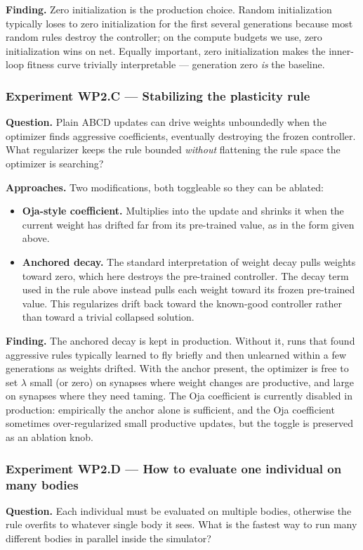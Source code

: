 \documentclass[letterpaper,10pt]{article}
\begin{document}
\textbf{Finding.} Zero initialization is the production choice. Random initialization typically loses to zero initialization for the first several generations because most random rules destroy the controller; on the compute budgets we use, zero initialization wins on net. Equally important, zero initialization makes the inner-loop fitness curve trivially interpretable --- generation zero \emph{is} the baseline.

\subsubsection{Experiment WP2.C --- Stabilizing the plasticity rule}
\textbf{Question.} Plain ABCD updates can drive weights unboundedly when the optimizer finds aggressive coefficients, eventually destroying the frozen controller. What regularizer keeps the rule bounded \emph{without} flattening the rule space the optimizer is searching?

\textbf{Approaches.} Two modifications, both toggleable so they can be ablated:
\begin{itemize}
    \item \textbf{Oja-style coefficient.} Multiplies into the update and shrinks it when the current weight has drifted far from its pre-trained value, as in the form given above.
    \item \textbf{Anchored decay.} The standard interpretation of weight decay pulls weights toward zero, which here destroys the pre-trained controller. The decay term used in the rule above instead pulls each weight toward its frozen pre-trained value. This regularizes drift back toward the known-good controller rather than toward a trivial collapsed solution.
\end{itemize}

\textbf{Finding.} The anchored decay is kept in production. Without it, runs that found aggressive rules typically learned to fly briefly and then unlearned within a few generations as weights drifted. With the anchor present, the optimizer is free to set $\lambda$ small (or zero) on synapses where weight changes are productive, and large on synapses where they need taming. The Oja coefficient is currently disabled in production: empirically the anchor alone is sufficient, and the Oja coefficient sometimes over-regularized small productive updates, but the toggle is preserved as an ablation knob.

\subsubsection{Experiment WP2.D --- How to evaluate one individual on many bodies}
\textbf{Question.} Each individual must be evaluated on multiple bodies, otherwise the rule overfits to whatever single body it sees. What is the fastest way to run many different bodies in parallel inside the simulator?
\end{document}
